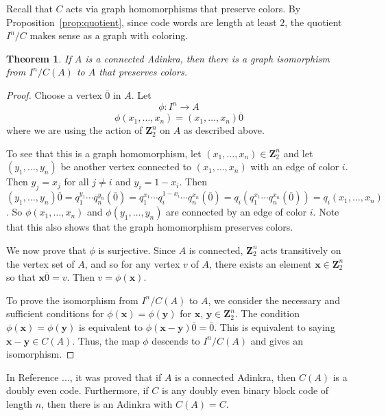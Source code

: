 \documentclass[12pt,twoside,singlespace]{article}
\numberwithin{equation}{section}
\newtheorem{thm}[equation]{Theorem}
\theoremstyle{definition}
\newcommand{\ZZ}{\mathbf{Z}}
\renewcommand{\vec}[1]{\mathbf{#1}}
\begin{document}
Recall that $C$ acts via graph homomorphisms that preserve colors.  By Proposition~\ref{prop:quotient}, since code words are length at least $2$, the quotient $I^n/C$ makes sense as a graph with coloring.

\begin{thm}
\label{thm:cubemodulocode}
If $A$ is a connected Adinkra, then there is a graph isomorphism from $I^n/C(A)$ to $A$ that preserves colors.
\end{thm}
\begin{proof}
Choose a vertex $\overline{0}$ in $A$.  Let
\[\phi:I^n\to A\]
\[\phi(x_1,\ldots,x_n)=(x_1,\ldots,x_n)\overline{0}\]
where we are using the action of $\ZZ_2^n$ on $A$ as described above.

To see that this is a graph homomorphism, let $(x_1,\ldots,x_n)\in\ZZ_2^n$ and let $(y_1,\ldots,y_n)$ be another vertex connected to $(x_1,\ldots,x_n)$ with an edge of color $i$.  Then $y_j=x_j$ for all $j\not=i$ and $y_i=1-x_i$.  Then $(y_1,\ldots,y_n)\overline{0}=q_1^{y_1}\cdots q_n^{y_n}(\overline{0}) =  q_1^{x_1}\cdots q_i^{1-x_i}\cdots q_n^{x_n}(\overline{0})=q_i(q_1^{x_1}\cdots q_n^{x_n}(\overline{0}))=q_i(x_1,\ldots,x_n)$.  So $\phi(x_1,\ldots,x_n)$ and $\phi(y_1,\ldots,y_n)$ are connected by an edge of color $i$.  Note that this also shows that the graph homomorphism preserves colors.

We now prove that $\phi$ is surjective.  Since $A$ is connected, $\ZZ_2^n$ acts transitively on the vertex set of $A$, and so for any vertex $v$ of $A$, there exists an element $\vec{x} \in\ZZ_2^n$ so that $\vec{x} \overline{0}=v$.  Then $v=\phi(\vec{x})$.

To prove the isomorphism from $I^n/C(A)$ to $A$, we consider the necessary and sufficient conditions for $\phi(\vec{x})=\phi(\vec{y})$ for $\vec{x}$, $\vec{y}\in \ZZ_2^n$.  The condition $\phi(\vec{x})=\phi(\vec{y})$ is equivalent to $\phi(\vec{x}-\vec{y})\overline{0}=\overline{0}$.  This is equivalent to saying $\vec{x}-\vec{y}\in C(A)$.  Thus, the map $\phi$ descends to $I^n/C(A)$ and gives an isomorphism.
\end{proof}

In Reference ..., it was proved that if $A$ is a connected Adinkra, then $C(A)$ is a doubly even code.  Furthermore, if $C$ is any doubly even binary block code of length $n$, then there is an Adinkra with $C(A)=C$.
\end{document}
